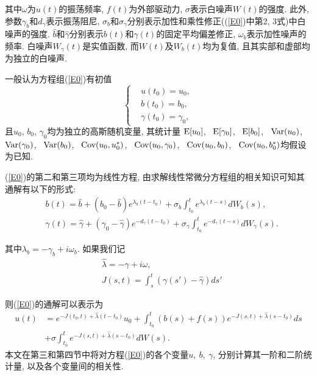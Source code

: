 \documentclass[notitlepage,cs4size,punct,oneside]{ctexrep}
\numberwithin{equation}{section}
\theoremstyle{mystyle}
\begin{document}
其中$\omega$为$u(t)$的振荡频率, $f(t)$为外部驱动力, $\sigma$表示白噪声$W(t)$的强度. 此外, 参数$\gamma_b$和$d_\gamma$表示振荡阻尼, $\sigma_b$和$\sigma_\gamma$分别表示加性和乘性修正((\ref{E0})中第2, 3式)中白噪声的强度. $\hat{b}$和$\hat{\gamma}$分别表示$b(t)$和$\gamma(t)$的固定平均偏差修正, $\omega_b$表示加性噪声的频率. 白噪声$W_\gamma(t)$是实值函数, 而$W(t)$及$W_b(t)$均为复值, 且其实部和虚部均为独立的白噪声. 

一般认为方程组(\ref{E0})有初值
\begin{equation} \label{init_values}
\left\{
\begin{split}
& u(t_0) = u_0, \\[5pt]
& b(t_0) = b_0, \\[5pt]
& \gamma(t_0) = \gamma_0,
\end{split}
\right.
\end{equation}
且$u_0$, $b_0$, $\gamma_0$均为独立的高斯随机变量, 其统计量
$\text{E}[u_0]$, ~$\text{E}[\gamma_0]$, ~$\text{E}[b_0]$, ~$\text{Var}(u_0)$, ~$\text{Var}(\gamma_0)$, ~$\text{Var}(b_0)$, ~$\text{Cov}(u_0, u_0^*)$, ~$\text{Cov}(u_0, \gamma_0)$, ~$\text{Cov}(u_0, b_0)$, ~$\text{Cov}(u_0, b_0^*)$均假设为已知.

(\ref{E0})的第二和第三项均为线性方程, 由求解线性常微分方程组的相关知识\cite{fulinjin1984ordinary}可知其通解有以下的形式:
\begin{equation} \label{Sb}
\begin{split}
&b(t) = \hat{b}+(b_0-\hat{b})e^{\lambda_b(t-t_0)}+\sigma_b\int_{t_0}^t e^{\lambda_b(t-s)}dW_b(s), \\[5pt]
&\gamma(t) = \hat{\gamma}+(\gamma_0-\hat{\gamma})e^{-d_{\gamma}(t-t_0)}+\sigma_{\gamma}\int_{t_0}^t e^{-d_{\gamma}(t-s)}dW_{\gamma}(s).
\end{split}
\end{equation}

其中$\lambda_b = -\gamma_b+i\omega_b$.
如果我们记
\begin{equation} \label{def J(s, t)}
\begin{split}
&\hat{\lambda} = -\hat{\gamma}+i\omega, \\[5pt]
&J(s, t) = \int_s^t (\gamma(s')-\hat{\gamma})ds'
\end{split}
\end{equation}

则(\ref{E0})的通解可以表示为
\begin{equation} \label{Su}
\begin{split}
u(t) &= e^{-J(t_0, t)+\hat{\lambda}(t-t_0)}u_0 + \int_{t_0}^t (b(s)+f(s))e^{-J(s, t)+\hat{\lambda}(s-t_0)}ds \\[5pt]
& + \sigma\int_{t_0}^{t}e^{-J(s, t)+\hat{\lambda}(s-t_0)}dW(s).
\end{split}
\end{equation}
本文在第三和第四节中将对方程(\ref{E0})的各个变量$u, ~b, ~\gamma$, 分别计算其一阶和二阶统计量, 以及各个变量间的相关性.
\end{document}

